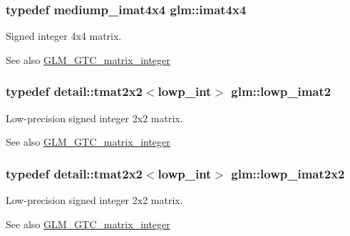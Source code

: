 \subsubsection[{imat4x4}]{\setlength{\rightskip}{0pt plus 5cm}typedef mediump\+\_\+imat4x4 {\bf glm\+::imat4x4}}\label{group__gtc__matrix__integer_ga367d8d5281ff82f1215a227dd2ea5ba9}
Signed integer 4x4 matrix. \begin{DoxySeeAlso}{See also}
\hyperlink{group__gtc__matrix__integer}{G\+L\+M\+\_\+\+G\+T\+C\+\_\+matrix\+\_\+integer} 
\end{DoxySeeAlso}
\hypertarget{group__gtc__matrix__integer_ga70fa8b07f1a12d400d669e4978a6795c}{}
\subsubsection[{lowp\+\_\+imat2}]{\setlength{\rightskip}{0pt plus 5cm}typedef detail\+::tmat2x2$<$lowp\+\_\+int$>$ {\bf glm\+::lowp\+\_\+imat2}}\label{group__gtc__matrix__integer_ga70fa8b07f1a12d400d669e4978a6795c}
Low-\/precision signed integer 2x2 matrix. \begin{DoxySeeAlso}{See also}
\hyperlink{group__gtc__matrix__integer}{G\+L\+M\+\_\+\+G\+T\+C\+\_\+matrix\+\_\+integer} 
\end{DoxySeeAlso}
\hypertarget{group__gtc__matrix__integer_gaaf7a95922fb146929cb174eea1cac2a8}{}
\subsubsection[{lowp\+\_\+imat2x2}]{\setlength{\rightskip}{0pt plus 5cm}typedef detail\+::tmat2x2$<$lowp\+\_\+int$>$ {\bf glm\+::lowp\+\_\+imat2x2}}\label{group__gtc__matrix__integer_gaaf7a95922fb146929cb174eea1cac2a8}
Low-\/precision signed integer 2x2 matrix. \begin{DoxySeeAlso}{See also}
\hyperlink{group__gtc__matrix__integer}{G\+L\+M\+\_\+\+G\+T\+C\+\_\+matrix\+\_\+integer} 
\end{DoxySeeAlso}
\hypertarget{group__gtc__matrix__integer_ga09e5448647001fa527ea02951cbca6ec}{}
